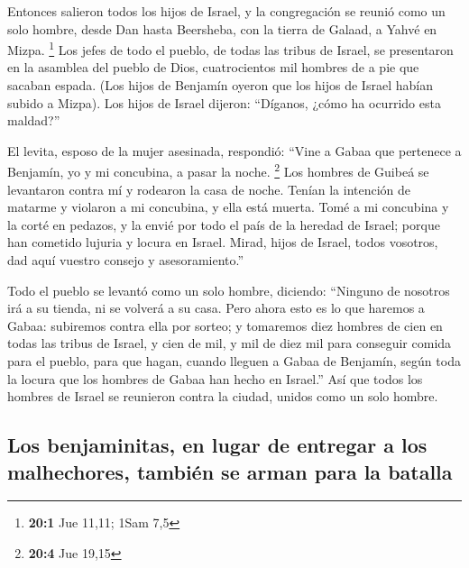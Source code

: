  Entonces salieron todos los hijos de Israel, y la
congregación se reunió como un solo hombre, desde Dan hasta Beersheba,
con la tierra de Galaad, a Yahvé en Mizpa. \footnote{\textbf{20:1} Jue
  11,11; 1Sam 7,5}  Los jefes de todo el pueblo, de todas
las tribus de Israel, se presentaron en la asamblea del pueblo de Dios,
cuatrocientos mil hombres de a pie que sacaban espada. 
(Los hijos de Benjamín oyeron que los hijos de Israel habían subido a
Mizpa). Los hijos de Israel dijeron: ``Díganos, ¿cómo ha ocurrido esta
maldad?''

 El levita, esposo de la mujer asesinada, respondió:
``Vine a Gabaa que pertenece a Benjamín, yo y mi concubina, a pasar la
noche. \footnote{\textbf{20:4} Jue 19,15}  Los hombres de
Guibeá se levantaron contra mí y rodearon la casa de noche. Tenían la
intención de matarme y violaron a mi concubina, y ella está muerta.
 Tomé a mi concubina y la corté en pedazos, y la envié por
todo el país de la heredad de Israel; porque han cometido lujuria y
locura en Israel.  Mirad, hijos de Israel, todos vosotros,
dad aquí vuestro consejo y asesoramiento.''

 Todo el pueblo se levantó como un solo hombre, diciendo:
``Ninguno de nosotros irá a su tienda, ni se volverá a su casa.
 Pero ahora esto es lo que haremos a Gabaa: subiremos
contra ella por sorteo;  y tomaremos diez hombres de cien
en todas las tribus de Israel, y cien de mil, y mil de diez mil para
conseguir comida para el pueblo, para que hagan, cuando lleguen a Gabaa
de Benjamín, según toda la locura que los hombres de Gabaa han hecho en
Israel.''  Así que todos los hombres de Israel se
reunieron contra la ciudad, unidos como un solo hombre.

\hypertarget{los-benjaminitas-en-lugar-de-entregar-a-los-malhechores-tambiuxe9n-se-arman-para-la-batalla}{%
\subsection{Los benjaminitas, en lugar de entregar a los malhechores,
también se arman para la
batalla}\label{los-benjaminitas-en-lugar-de-entregar-a-los-malhechores-tambiuxe9n-se-arman-para-la-batalla}}

